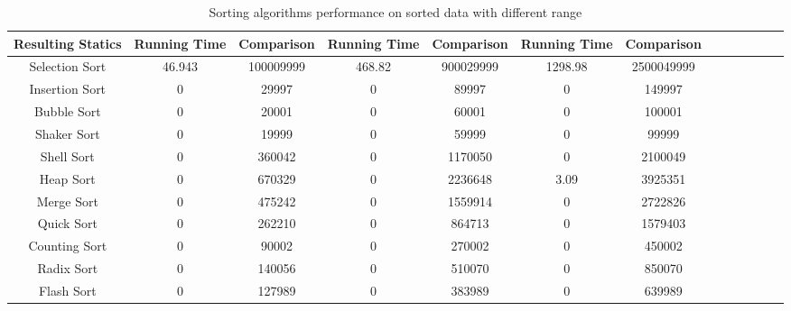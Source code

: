 \documentclass[11pt,a4paper]{article}
\begin{document}
{\begin{table}[H]
{\begin{tabular}{|c|c|c|c|c|c|c|c|c|c|c|c|c|}
		 \hline
		 Resulting Statics & Running Time & Comparison & Running Time & Comparison & Running Time & Comparison\\
		 \hline
		 Selection Sort & 46.943 & 100009999 & 468.82 & 900029999 & 1298.98 & 2500049999\\
		 \hline
		 Insertion Sort & 0 & 29997 & 0 & 89997 & 0 & 149997\\
		 \hline
		 Bubble Sort 	& 0 & 20001 & 0 & 60001 & 0 & 100001\\
		 \hline
		 Shaker Sort 	& 0 & 19999 & 0 & 59999 & 0 & 99999\\
		 \hline
		 Shell Sort		& 0 & 360042 & 0 & 1170050 & 0 & 2100049\\
		 \hline
		 Heap Sort		& 0 & 670329 & 0 & 2236648 & 3.09 & 3925351\\
		 \hline
		 Merge Sort		& 0 & 475242 & 0 & 1559914 & 0 & 2722826\\
		 \hline
		 Quick Sort		& 0 & 262210 & 0 & 864713 & 0 & 1579403\\
		 \hline
		 Counting Sort 	& 0 & 90002 & 0 & 270002 & 0 & 450002\\
		 \hline
		 Radix Sort 	& 0 & 140056 & 0 & 510070 & 0 & 850070\\
		 \hline
		 Flash Sort 	& 0 & 127989 & 0 & 383989 & 0 & 639989\\
		 \hline
		\end{tabular}}
		\caption{Sorting algorithms performance on sorted data with different range}
		\end{table}
		
}
\end{document}
